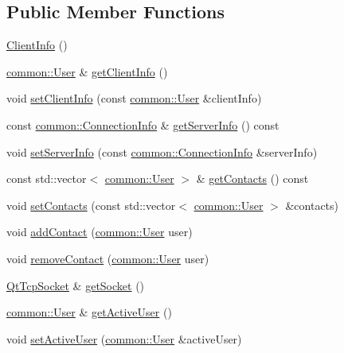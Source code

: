 \subsection*{Public Member Functions}
\begin{DoxyCompactItemize}
\item 
\mbox{\hyperlink{classbabel_1_1client_1_1_client_info_a8a2766895591fac80b31912cb79c318c}{Client\+Info}} ()
\item 
\mbox{\hyperlink{classbabel_1_1common_1_1_user}{common\+::\+User}} \& \mbox{\hyperlink{classbabel_1_1client_1_1_client_info_a50cd2a1bae911402337b166c55d28770}{get\+Client\+Info}} ()
\item 
void \mbox{\hyperlink{classbabel_1_1client_1_1_client_info_ab407de71f67f88b03265ee33f3cb070b}{set\+Client\+Info}} (const \mbox{\hyperlink{classbabel_1_1common_1_1_user}{common\+::\+User}} \&client\+Info)
\item 
const \mbox{\hyperlink{classbabel_1_1common_1_1_connection_info}{common\+::\+Connection\+Info}} \& \mbox{\hyperlink{classbabel_1_1client_1_1_client_info_a800b3a6c7bb9fbd52b2400f0f5fa355e}{get\+Server\+Info}} () const
\item 
void \mbox{\hyperlink{classbabel_1_1client_1_1_client_info_a7d7a9a5b48806f077885ba4cf5743eb5}{set\+Server\+Info}} (const \mbox{\hyperlink{classbabel_1_1common_1_1_connection_info}{common\+::\+Connection\+Info}} \&server\+Info)
\item 
const std\+::vector$<$ \mbox{\hyperlink{classbabel_1_1common_1_1_user}{common\+::\+User}} $>$ \& \mbox{\hyperlink{classbabel_1_1client_1_1_client_info_ab1907aee14edda4e7e4dab169c6f0262}{get\+Contacts}} () const
\item 
void \mbox{\hyperlink{classbabel_1_1client_1_1_client_info_afd3e45ca7ab8c7fce4184b38cc40dd05}{set\+Contacts}} (const std\+::vector$<$ \mbox{\hyperlink{classbabel_1_1common_1_1_user}{common\+::\+User}} $>$ \&contacts)
\item 
void \mbox{\hyperlink{classbabel_1_1client_1_1_client_info_a0f19c690db9036d424ea8f70902acef0}{add\+Contact}} (\mbox{\hyperlink{classbabel_1_1common_1_1_user}{common\+::\+User}} user)
\item 
void \mbox{\hyperlink{classbabel_1_1client_1_1_client_info_a31a1e8e054e49b645f40ae7ca3591f13}{remove\+Contact}} (\mbox{\hyperlink{classbabel_1_1common_1_1_user}{common\+::\+User}} user)
\item 
\mbox{\hyperlink{classbabel_1_1client_1_1_qt_tcp_socket}{Qt\+Tcp\+Socket}} \& \mbox{\hyperlink{classbabel_1_1client_1_1_client_info_a79e777c3c93f940094ad138bc4445d81}{get\+Socket}} ()
\item 
\mbox{\hyperlink{classbabel_1_1common_1_1_user}{common\+::\+User}} \& \mbox{\hyperlink{classbabel_1_1client_1_1_client_info_ace2f9fbe7d629a1a349195e4cbe437d8}{get\+Active\+User}} ()
\item 
void \mbox{\hyperlink{classbabel_1_1client_1_1_client_info_a1c003c4161627708b555d1108cd910f2}{set\+Active\+User}} (\mbox{\hyperlink{classbabel_1_1common_1_1_user}{common\+::\+User}} \&active\+User)
\end{DoxyCompactItemize}


